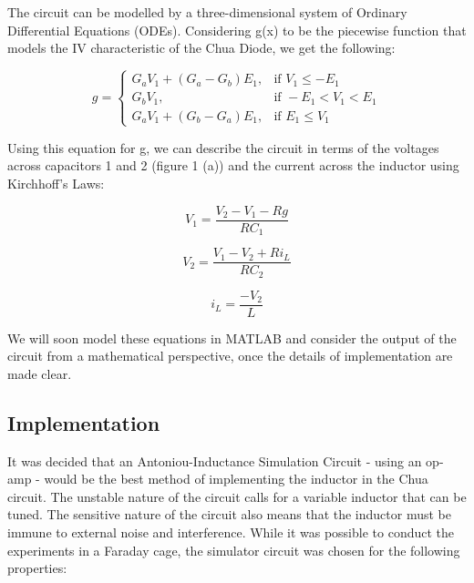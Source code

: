 \documentclass[jou,apacite]{apa6}
\begin{document}
The circuit can be modelled by a three-dimensional system of Ordinary Differential Equations (ODEs). Considering g(x) to be the piecewise function that models the IV characteristic of the Chua Diode, we get the following:

\begin{equation}
 g = 
 \begin{cases}
  G_a V_1 + (G_a - G_b) E_1 , & \text{if } V_1 \leqslant -E_1 \\
  G_b V_1 , & \text{if } -E_1 < V_1 < E_1 \\
  G_a V_1 + (G_b - G_a) E_1 , & \text{if } E_1 \leqslant V_1
 \end{cases}
\end{equation}

Using this equation for g, we can describe the circuit in terms of the voltages across capacitors 1 and 2 (figure 1 (a)) and the current across the inductor using Kirchhoff's Laws:

\begin{equation}
V_1 = \frac{V_2 - V_1 - Rg}{RC_1} 
\end{equation}

\begin{equation}
V_2 = \frac{V_1 - V_2 + Ri_L}{RC_2}
\end{equation}

\begin{equation}
i_L = \frac{-V_2}{L}
\end{equation}

We will soon model these equations in MATLAB and consider the output of the circuit from a mathematical perspective, once the details of implementation are made clear.

\subsection{Implementation}

It was decided that an Antoniou-Inductance Simulation Circuit - using an op-amp - would be the best method of implementing the inductor in the Chua circuit. The unstable nature of the circuit calls for a variable inductor that can be tuned. The sensitive nature of the circuit also means that the inductor must be immune to external noise and interference. While it was possible to conduct the experiments in a Faraday cage, the simulator circuit was chosen for the following properties:
\end{document}
